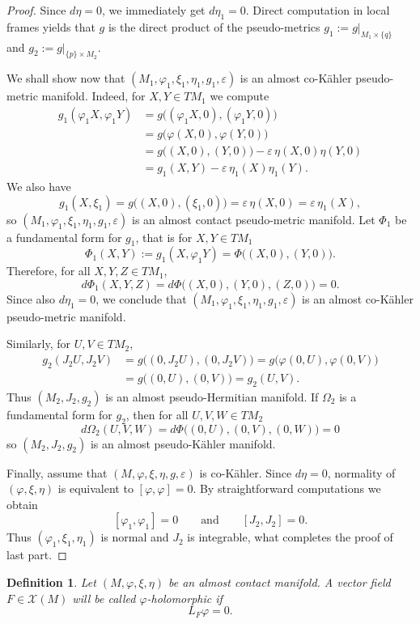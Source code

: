 \documentclass[12pt,a4paper,final]{amsart}
\numberwithin{equation}{section}
\theoremstyle{df}
\newtheorem{df}[tw]{Definition}
\newcommand{\X}{\mathcal{X}}
\newcommand{\XM}{\X(M)}
\newcommand{\eps}{\varepsilon}
\begin{document}
\begin{proof}
Since $d\eta=0$, we immediately get $d\eta_1=0$. Direct computation in local frames yields
 that $g$ is
the direct product of the pseudo-metrics $g_1:=g|_{M_1\times\{q\}}$ and $g_2:=g|_{\{p\}\times M_2}$.
\par We shall show now that $(M_1,\varphi_1,\xi_1,\eta_1,g_1,\eps)$ is an almost co-K\"ahler pseudo-metric manifold. Indeed, for $X,Y\in TM_1$ we compute
\begin{align*}
g_1(\varphi_1X,\varphi_1Y)
&=g\bigl((\varphi_1X,0),(\varphi_1Y,0)\bigr)\\
&=g\bigl(\varphi(X,0),\varphi(Y,0)\bigr)\\
&=g\bigl((X,0),(Y,0)\bigr)-\eps\,\eta(X,0)\eta(Y,0)\\
&=g_1(X,Y)-\eps\,\eta_1(X)\eta_1(Y).
\end{align*}
We also have
$$
g_1(X,\xi_1)=g\bigl((X,0),(\xi_1,0)\bigr)=\eps\,\eta(X,0)=\eps\,\eta_1(X),
$$
so $(M_1,\varphi_1,\xi_1,\eta_1,g_1,\eps)$ is an almost contact pseudo-metric manifold.
Let $\Phi_1$ be  a fundamental form for $g_1$, that is for $X,Y\in TM_1$
$$
\Phi_1(X,Y):=g_1(X,\varphi_1Y)=\Phi\bigl((X,0),(Y,0)\bigr).
$$
Therefore, for all $X,Y,Z\in TM_1$,
$$
d\Phi_1(X,Y,Z)=d\Phi\bigl((X,0),(Y,0),(Z,0)\bigr)=0.
$$
Since also $d\eta_1=0$, we conclude that $(M_1,\varphi_1,\xi_1,\eta_1,g_1,\eps)$ is an almost co-K\"ahler pseudo-metric manifold.
\par Similarly, for $U,V\in TM_2$,
\begin{align*}
g_2(J_2U,J_2V)
&=g\bigl((0,J_2U),(0,J_2V)\bigr)=g\bigl(\varphi(0,U),\varphi(0,V)\bigr)\\
&=g\bigl((0,U),(0,V)\bigr)=g_2(U,V).
\end{align*}
Thus $(M_2,J_2,g_2)$ is an almost pseudo-Hermitian manifold. If $\Omega_2$ is a fundamental form for $g_2$, then for all $U,V,W\in TM_2$
$$
d\Omega_2(U,V,W)=d\Phi\bigl((0,U),(0,V),(0,W)\bigr)=0
$$
so $(M_2,J_2,g_2)$ is an almost pseudo-K\"ahler manifold.

Finally, assume that $(M,\varphi,\xi,\eta,g,\eps)$ is co-K\"ahler. Since $d\eta=0$, normality of $(\varphi,\xi,\eta)$ is equivalent to $[\varphi,\varphi]=0$.
By straightforward computations we obtain
$$
[\varphi_1,\varphi_1]=0
\qquad\text{and}\qquad
[J_2,J_2]=0.
$$
Thus $(\varphi_1,\xi_1,\eta_1)$ is normal and $J_2$ is integrable, what completes the proof of last part.
\end{proof}

\begin{df}\label{df::phihol}
Let $(M,\varphi,\xi,\eta)$ be an almost contact manifold. A vector field
$F\in\XM$ will be called \emph{$\varphi$-holomorphic} if
$$
L_F\varphi=0.
$$
\end{df}
\end{document}
